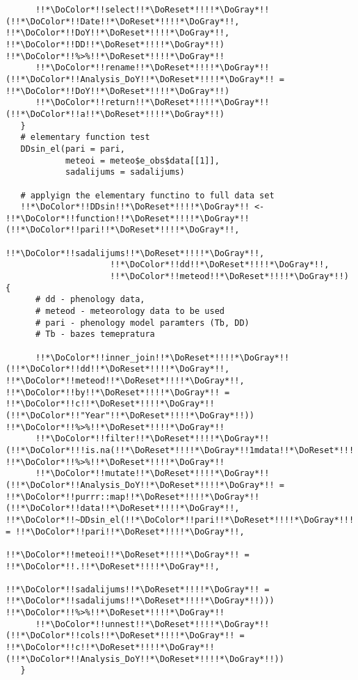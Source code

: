 \begin{verbatim}
      !!*\DoColor*!!select!!*\DoReset*!!!!*\DoGray*!!(!!*\DoColor*!!Date!!*\DoReset*!!!!*\DoGray*!!, !!*\DoColor*!!DoY!!*\DoReset*!!!!*\DoGray*!!, !!*\DoColor*!!DD!!*\DoReset*!!!!*\DoGray*!!) !!*\DoColor*!!%>%!!*\DoReset*!!!!*\DoGray*!!
      !!*\DoColor*!!rename!!*\DoReset*!!!!*\DoGray*!!(!!*\DoColor*!!Analysis_DoY!!*\DoReset*!!!!*\DoGray*!! = !!*\DoColor*!!DoY!!*\DoReset*!!!!*\DoGray*!!)
      !!*\DoColor*!!return!!*\DoReset*!!!!*\DoGray*!!(!!*\DoColor*!!a!!*\DoReset*!!!!*\DoGray*!!)
   }
   # elementary function test
   DDsin_el(pari = pari,
            meteoi = meteo$e_obs$data[[1]],
            sadalijums = sadalijums)

   # applyign the elementary functino to full data set
   !!*\DoColor*!!DDsin!!*\DoReset*!!!!*\DoGray*!! <- !!*\DoColor*!!function!!*\DoReset*!!!!*\DoGray*!!(!!*\DoColor*!!pari!!*\DoReset*!!!!*\DoGray*!!,
                     !!*\DoColor*!!sadalijums!!*\DoReset*!!!!*\DoGray*!!,
                     !!*\DoColor*!!dd!!*\DoReset*!!!!*\DoGray*!!,
                     !!*\DoColor*!!meteod!!*\DoReset*!!!!*\DoGray*!!) {
      # dd - phenology data,
      # meteod - meteorology data to be used
      # pari - phenology model paramters (Tb, DD)
      # Tb - bazes temepratura

      !!*\DoColor*!!inner_join!!*\DoReset*!!!!*\DoGray*!!(!!*\DoColor*!!dd!!*\DoReset*!!!!*\DoGray*!!, !!*\DoColor*!!meteod!!*\DoReset*!!!!*\DoGray*!!, !!*\DoColor*!!by!!*\DoReset*!!!!*\DoGray*!! = !!*\DoColor*!!c!!*\DoReset*!!!!*\DoGray*!!(!!*\DoColor*!!"Year"!!*\DoReset*!!!!*\DoGray*!!)) !!*\DoColor*!!%>%!!*\DoReset*!!!!*\DoGray*!!
      !!*\DoColor*!!filter!!*\DoReset*!!!!*\DoGray*!!(!!*\DoColor*!!!is.na(!!*\DoReset*!!!!*\DoGray*!!1mdata!!*\DoReset*!!!!*\DoGray*!!)) !!*\DoColor*!!%>%!!*\DoReset*!!!!*\DoGray*!!
      !!*\DoColor*!!mutate!!*\DoReset*!!!!*\DoGray*!!(!!*\DoColor*!!Analysis_DoY!!*\DoReset*!!!!*\DoGray*!! = !!*\DoColor*!!purrr::map!!*\DoReset*!!!!*\DoGray*!!(!!*\DoColor*!!data!!*\DoReset*!!!!*\DoGray*!!, !!*\DoColor*!!~DDsin_el(!!*\DoColor*!!pari!!*\DoReset*!!!!*\DoGray*!!!!*\DoReset*!!!!*\DoGray*!! = !!*\DoColor*!!pari!!*\DoReset*!!!!*\DoGray*!!,
                                                         !!*\DoColor*!!meteoi!!*\DoReset*!!!!*\DoGray*!! = !!*\DoColor*!!.!!*\DoReset*!!!!*\DoGray*!!,
                                                         !!*\DoColor*!!sadalijums!!*\DoReset*!!!!*\DoGray*!! = !!*\DoColor*!!sadalijums!!*\DoReset*!!!!*\DoGray*!!))) !!*\DoColor*!!%>%!!*\DoReset*!!!!*\DoGray*!!
      !!*\DoColor*!!unnest!!*\DoReset*!!!!*\DoGray*!!(!!*\DoColor*!!cols!!*\DoReset*!!!!*\DoGray*!! = !!*\DoColor*!!c!!*\DoReset*!!!!*\DoGray*!!(!!*\DoColor*!!Analysis_DoY!!*\DoReset*!!!!*\DoGray*!!))
   }


\end{verbatim}
